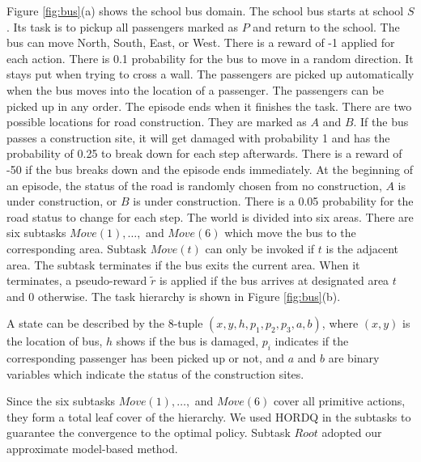 Figure \ref{fig:bus}(a) shows the school bus domain. The school bus starts at school $S$. Its task 
is to pickup all passengers marked as $P$ and return to the school.
The bus can move North, South, East, or West. There is a reward of -1 applied for each action.
There is 0.1 probability for the bus to move in a random direction. It stays put 
when trying to cross a wall. 
The passengers are picked up automatically when the bus moves into
the location of a passenger. The passengers can be picked up in any order.
The episode ends when it finishes the task.  
There are two possible locations for road construction. They are marked as 
$A$ and $B$. If the bus passes a construction site, it will get damaged with probability 1 and has the probability
of 0.25 to break down for each step afterwards. There is a reward of -50 if the bus breaks down and the episode ends immediately. 
At the beginning of an episode, the status of the road is randomly chosen from no construction, $A$ is under construction,
or $B$ is under construction. There is a 0.05 probability for the road status to change for each step.
The world is divided into six areas. There are six subtasks $Move(1), \dots,$ and $Move(6)$ which move the
bus to the corresponding area.
Subtask $Move(t)$ can only be invoked if $t$ is the adjacent area.
The subtask terminates if the bus exits the current area.
When it terminates, a pseudo-reward $\tilde{r}$ is applied if the bus arrives at designated area $t$ and 0 otherwise.
The task hierarchy is shown in Figure \ref{fig:bus}(b). 

A state can be described by the 8-tuple $(x, y, h, p_1, p_2, p_3, a, b)$, where $(x, y)$ is the location of 
bus, $h$ shows if the bus is damaged, $p_i$ indicates if the corresponding passenger has been picked up or not,
and $a$ and $b$ are binary variables which indicate the status of the construction sites.

Since the six subtasks $Move(1), \dots,$ and $Move(6)$ cover all primitive actions, they form a total leaf cover of the hierarchy.
We used HORDQ in the subtasks to guarantee the convergence to the optimal
policy. Subtask $Root$ adopted our approximate model-based method. 



